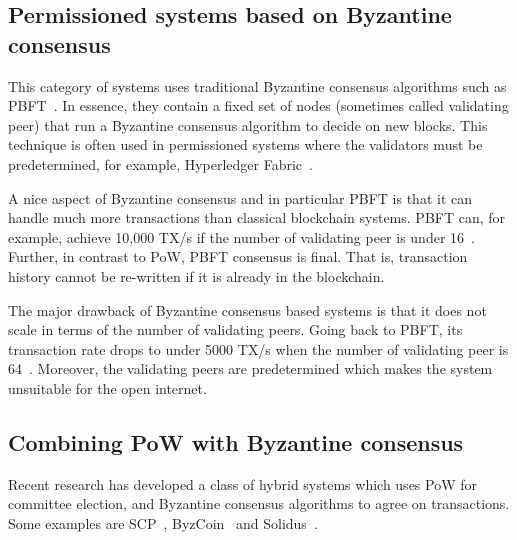 \subsection{Permissioned systems based on Byzantine consensus}

This category of systems uses traditional Byzantine consensus algorithms such as PBFT~\cite{castro1999practical}.
In essence, they contain a fixed set of nodes (sometimes called validating peer) that run a Byzantine consensus algorithm to decide on new blocks.
This technique is often used in permissioned systems where the validators must be predetermined,
for example, Hyperledger Fabric~\cite{cachin2016architecture}.

A nice aspect of Byzantine consensus and in particular PBFT is that it can handle much more transactions than classical blockchain systems.
PBFT can, for example, achieve 10,000 TX/s if the number of validating peer is under 16~\cite[Section 5.2]{miller2016honey}.
Further, in contrast to PoW, PBFT consensus is final.
That is, transaction history cannot be re-written if it is already in the blockchain.

The major drawback of Byzantine consensus based systems is that it does not scale in terms of the number of validating peers.
Going back to PBFT, its transaction rate drops to under 5000 TX/s when the number of validating peer is 64~\cite[Section 5.2]{miller2016honey}.
Moreover, the validating peers are predetermined which makes the system unsuitable for the open internet.



\subsection{Combining PoW with Byzantine consensus}
Recent research has developed a class of hybrid systems which uses PoW for committee election,
and Byzantine consensus algorithms to agree on transactions.
Some examples are SCP~\cite{luu2015scp}, ByzCoin~\cite{kogias2016enhancing} and Solidus~\cite{abraham2016solidus}.

